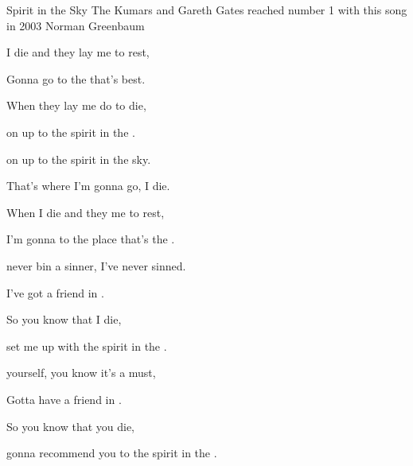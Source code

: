 \begin{SBSong}{Spirit in the Sky}
  {The Kumars and Gareth Gates reached number 1 with this song in 2003}
  {Norman Greenbaum}
  \begin{SBVerse}
     I die and they lay me to rest,
    
    Gonna go to the  that's best.
    
    When they lay me do to die,
    
     on up to the spirit in the .
  \end{SBVerse}
  \begin{SBChorus}
     on up to the spirit in the sky.
    
    That's where I'm gonna go,  I die.
    
    When I die and they  me to rest,
    
    I'm gonna  to the place that's the .
  \end{SBChorus}
  \begin{SBVerse}
     never bin a sinner, I've never sinned.
    
    I've got a friend in .
    
    So you know that  I die,
    
     set me up with the spirit in the .
  \end{SBVerse}
  \begin{SBVerse}
     yourself, you know it's a must,
    
    Gotta have a friend in .
    
    So you know that  you die,
    
     gonna recommend you to the spirit in the .
  \end{SBVerse}
\end{SBSong}